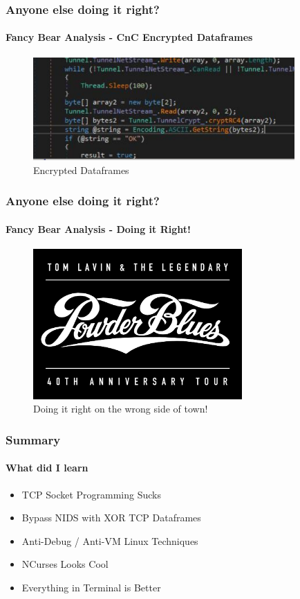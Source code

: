 \documentclass[aspectratio=169]{beamer}
\begin{document}
\begin{frame}
  \frametitle{Anyone else doing it right?}
  \framesubtitle{Fancy Bear Analysis - CnC Encrypted Dataframes}
  \begin{center}
    \begin{figure}
      \includegraphics[width=10cm,keepaspectratio]{fancy_bear_analysis_9}
      \caption{Encrypted Dataframes}
    \end{figure}
  \end{center}
\end{frame}

\begin{frame}
  \frametitle{Anyone else doing it right?}
  \framesubtitle{Fancy Bear Analysis - Doing it Right!}
  \begin{center}
    \begin{figure}
      \includegraphics[width=8cm,keepaspectratio]{powder_blues}
      \caption{Doing it right on the wrong side of town!}
    \end{figure}
  \end{center}
\end{frame}

\begin{frame}
  \frametitle{Summary}
  \framesubtitle{What did I learn}
  \begin{itemize}
  \item{TCP Socket Programming Sucks}
  \item{Bypass NIDS with XOR TCP Dataframes}
  \item{Anti-Debug / Anti-VM Linux Techniques}
  \item{NCurses Looks Cool}
  \item{Everything in Terminal is Better}
  \end{itemize}
\end{frame}
\end{document}
